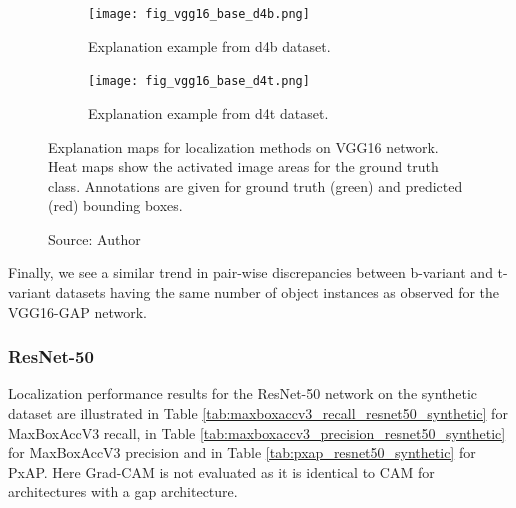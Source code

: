 \begin{figure}[h]
    \begin{center}
    \begin{subfigure}[b]{\textwidth}
         \centering
         \texttt{[image: fig\_vgg16\_base\_d4b.png]}
         \caption{Explanation example from d4b dataset.}
         \label{fig:vgg16_base_explanation_d4b}
    \end{subfigure}
    \begin{subfigure}[b]{\textwidth}
         \centering
         \texttt{[image: fig\_vgg16\_base\_d4t.png]}
         \caption{Explanation example from d4t dataset.}
         \label{fig:vgg16_base_explanation_d4t}
    \end{subfigure}
    \caption[Explanation maps for localization methods on VGG16 network]{Explanation maps for localization methods on VGG16 network. Heat maps show the activated image areas for the ground truth class. Annotations are given for ground truth (green) and predicted (red) bounding boxes.}
    \caption*{Source: Author}
    \label{fig:vgg16_base_explanation}
    \end{center}
\end{figure}

Finally, we see a similar trend in pair-wise discrepancies between b-variant and t-variant datasets having the same number of object instances as observed for the VGG16-GAP network.  

\subsubsection{ResNet-50}
Localization performance results for the ResNet-50 network on the synthetic dataset are illustrated in Table \ref{tab:maxboxaccv3_recall_resnet50_synthetic} for MaxBoxAccV3 recall, in Table \ref{tab:maxboxaccv3_precision_resnet50_synthetic} for MaxBoxAccV3 precision and in Table \ref{tab:pxap_resnet50_synthetic} for PxAP. Here Grad-CAM is not evaluated as it is identical to CAM for architectures with a \acrshort{gap} architecture.

